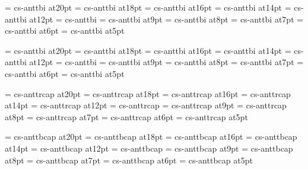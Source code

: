 \font\twentyitbf=      cs-anttbi at20pt
\font\eighteenitbf=    cs-anttbi at18pt
\font\sixteenitbf=     cs-anttbi at16pt
\font\fourteenitbf=    cs-anttbi at14pt
\font\twelveitbf=      cs-anttbi at12pt
\font\itbf=            cs-anttbi
\font\nineitbf=        cs-anttbi at9pt
\font\eightitbf=       cs-anttbi at8pt
\font\sevenitbf=       cs-anttbi at7pt
\font\sixitbf=         cs-anttbi at6pt
\font\fiveitbf=        cs-anttbi at5pt

\font\twentyslbf=      cs-anttbi at20pt
\font\eighteenslbf=    cs-anttbi at18pt
\font\sixteenslbf=     cs-anttbi at16pt
\font\fourteenslbf=    cs-anttbi at14pt
\font\twelveslbf=      cs-anttbi at12pt
\font\slbf=            cs-anttbi
\font\nineslbf=        cs-anttbi at9pt
\font\eightslbf=       cs-anttbi at8pt
\font\sevenslbf=       cs-anttbi at7pt
\font\sixslbf=         cs-anttbi at6pt
\font\fiveslbf=        cs-anttbi at5pt

\font\twentycaps=      cs-anttrcap at20pt
\font\eighteencaps=    cs-anttrcap at18pt
\font\sixteencaps=     cs-anttrcap at16pt
\font\fourteencaps=    cs-anttrcap at14pt
\font\twelvecaps=      cs-anttrcap at12pt
\font\caps=            cs-anttrcap
\font\ninecaps=        cs-anttrcap at9pt
\font\eightcaps=       cs-anttrcap at8pt
\font\sevencaps=       cs-anttrcap at7pt
\font\sixcaps=         cs-anttrcap at6pt
\font\fivecaps=        cs-anttrcap at5pt

\font\twentycapsbf=      cs-anttbcap at20pt
\font\eighteencapsbf=    cs-anttbcap at18pt
\font\sixteencapsbf=     cs-anttbcap at16pt
\font\fourteencapsbf=    cs-anttbcap at14pt
\font\twelvcsapsbf=      cs-anttbcap at12pt
\font\capsbf=            cs-anttbcap
\font\nincsapsbf=        cs-anttbcap at9pt
\font\eightcapsbf=       cs-anttbcap at8pt
\font\sevencapsbf=       cs-anttbcap at7pt
\font\sixcapsbf=         cs-anttbcap at6pt
\font\fivcsapsbf=        cs-anttbcap at5pt

\rm 